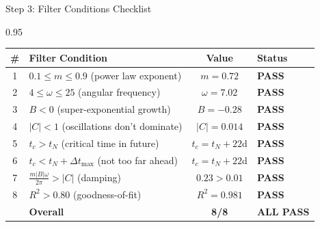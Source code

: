 \documentclass[9pt, aspectratio=169, t]{beamer}
\begin{document}
\begin{frame}{Step 3: Filter Conditions Checklist}
    \begin{cminipage}{0.95\textwidth}
    {\footnotesize
    \begin{center}
        \begin{tabular}{clcl}
            \toprule
            \textbf{\#} & \textbf{Filter Condition} & \textbf{Value} & \textbf{Status} \\
            \midrule
            1 & $0.1 \leq m \leq 0.9$ (power law exponent) & $m = 0.72$ & \textcolor{Forest}{\textbf{PASS}} \\
            2 & $4 \leq \omega \leq 25$ (angular frequency) & $\omega = 7.02$ & \textcolor{Forest}{\textbf{PASS}} \\
            3 & $B < 0$ (super-exponential growth) & $B = -0.28$ & \textcolor{Forest}{\textbf{PASS}} \\
            4 & $|C| < 1$ (oscillations don't dominate) & $|C| = 0.014$ & \textcolor{Forest}{\textbf{PASS}} \\
            5 & $t_c > t_N$ (critical time in future) & $t_c = t_N + 22$d & \textcolor{Forest}{\textbf{PASS}} \\
            6 & $t_c < t_N + \Delta t_{\max}$ (not too far ahead) & $t_c = t_N + 22$d & \textcolor{Forest}{\textbf{PASS}} \\
            7 & $\frac{m|B|\omega}{2\pi} > |C|$ (damping) & $0.23 > 0.01$ & \textcolor{Forest}{\textbf{PASS}} \\
            8 & $R^2 > 0.80$ (goodness-of-fit) & $R^2 = 0.981$ & \textcolor{Forest}{\textbf{PASS}} \\
            \midrule
            & \textbf{Overall} & \textbf{8/8} & \textcolor{Forest}{\textbf{ALL PASS}} \\
            \bottomrule
        \end{tabular}
    \end{center}

}
\end{cminipage}
\end{frame}
\end{document}

